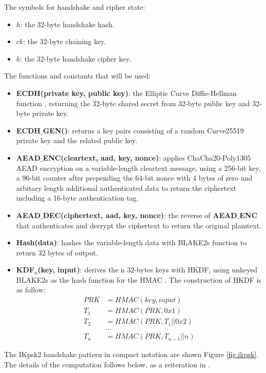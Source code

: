  The symbols for handshake and cipher state:
    \begin{itemize}
      \item $h$: the 32-byte handshake hash.
      \item $ck$: the 32-byte chaining key.
      \item $k$: the 32-byte handshake cipher key.
    \end{itemize}
  
  The functions and constants that will be used:
    \begin{itemize}
      \item \textbf{ECDH(private key, public key)}: the Elliptic Curve Diffie-Hellman function \cite{curve},
      returning the 32-byte shared secret from 32-byte public key and 32-byte private key.
      \item \textbf{ECDH$\_$GEN()}: returns a key pairs consisting of a random Curve25519 private key and
      the related public key.
      \item \textbf{AEAD$\_$ENC(cleartext, aad, key, nonce)}: applies ChaCha20-Poly1305 AEAD encryption
      on a variable-length cleartext message, using a 256-bit key, a 96-bit counter after prepending the 64-bit nonce
      with 4 bytes of zero and arbitary length additional authenticated data to return the ciphertext
      including a 16-byte authentication tag.
      \item \textbf{AEAD$\_$DEC(ciphertext, aad, key, nonce)}: the reverse of \textbf{AEAD$\_$ENC} that
      authenticates and decrypt the ciphertext to return the original plaintext.
      \item \textbf{Hash(data)}: hashes the variable-length data with BLAKE2s function to return
      32 bytes of output.
      \item \textbf{KDF$_n$(key, input)}: derives the n 32-bytes keys with HKDF, using unkeyed 
      BLAKE2s as the hash function for the HMAC \cite[section 13.2]{crypto}. The construction of
      HKDF is as follow:
      \begin{align*}
        PRK  &= HMAC(key, input) \\
        T_1  &= HMAC(PRK, 0x1) \\
        T_2  &= HMAC(PRK, T_1 || 0x2) \\
        &\dots \\
        T_n  &= HMAC(PRK, T_{n - 1} || n)
    \end{align*}
    \end{itemize}

    The IKpsk2 handshake pattern in compact notation are shown Figure \ref{fig:ikpsk}. The details of the
    computation follows below, as a reiteration in \cite[p.~15]{pwu}.

